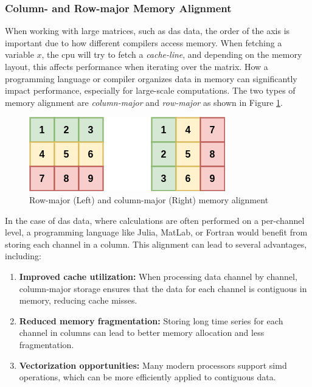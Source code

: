 \subsubsection{Column- and Row-major Memory Alignment}
%
When working with large matrices, such as \acrshort{das} data, the order of the axis is important due to how different compilers access memory. When fetching a variable $x$, the \acrfull{cpu} will try to fetch a  \textit{cache-line}, and depending on the memory layout, this affects performance when iterating over the matrix. How a programming language or compiler organizes data in memory can significantly impact performance, especially for large-scale computations. The two types of memory alignment are \textit{column-major} and \textit{row-major} as shown in Figure \ref{fig:rowcol}.
%
\begin{figure}[!h]
    \centering
    \includegraphics[width=0.5\linewidth]{figures/rowcol.png}
    \caption{Row-major (Left) and column-major (Right) memory alignment}
    \label{fig:rowcol}
\end{figure}
\clearpage
%
In the case of \acrshort{das} data, where calculations are often performed on a per-channel level, a programming language like Julia, MatLab, or Fortran would benefit from storing each channel in a column. This alignment can lead to several advantages, including:
\begin{enumerate}
\item \textbf{Improved cache utilization:} When processing data channel by channel, column-major storage ensures that the data for each channel is contiguous in memory, reducing cache misses.
\item \textbf{Reduced memory fragmentation:} Storing long time series for each channel in columns can lead to better memory allocation and less fragmentation.
\item \textbf{Vectorization opportunities:} Many modern processors support \acrfull{simd} \cite{ren2006optimizing} operations, which can be more efficiently applied to contiguous data.
\end{enumerate}
%
